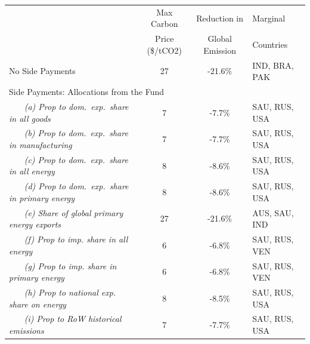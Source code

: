 \begin{center}
\small
\setlength{\tabcolsep}{4pt}
\renewcommand{\arraystretch}{1.25}
\begin{tabular}{l cc l}
\hline
 & Max Carbon & Reduction in  & Marginal \\
 & Price (\$/tCO2) & Global Emission & Countries \\
\hline
 No Side Payments & 27 & -21.6\% & IND, BRA, PAK \\
\multicolumn{4}{l}{Side Payments: Allocations from the Fund} \\
 ~~~ \textit{(a) Prop to dom.\ exp.\ share in all goods} & 7 & -7.7\% & SAU, RUS, USA \\
 ~~~ \textit{(b) Prop to dom.\ exp.\ share in manufacturing} & 7 & -7.7\% & SAU, RUS, USA \\
 ~~~ \textit{(c) Prop to dom.\ exp.\ share in all energy} & 8 & -8.6\% & SAU, RUS, USA \\
 ~~~ \textit{(d) Prop to dom.\ exp.\ share in primary energy} & 8 & -8.6\% & SAU, RUS, USA \\
 ~~~ \textit{(e) Share of global primary energy exports} & 27 & -21.6\% & AUS, SAU, IND \\
 ~~~ \textit{(f) Prop to imp. share in all energy} & 6 & -6.8\% & SAU, RUS, VEN \\
 ~~~ \textit{(g) Prop to imp. share in primary energy} & 6 & -6.8\% & SAU, RUS, VEN \\
 ~~~ \textit{(h) Prop to national exp. share on energy} & 8 & -8.5\% & SAU, RUS, USA \\
 ~~~ \textit{(i) Prop to RoW historical emissions} & 7 & -7.7\% & SAU, RUS, USA \\
\hline
\end{tabular}
\end{center}
